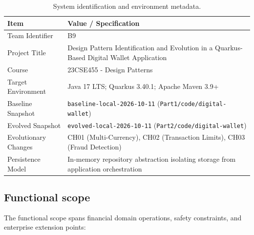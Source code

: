 \documentclass[11pt,a4paper]{article}
\begin{document}
\begin{table}[h!]
\centering
\small
\begin{tabularx}{\textwidth}{lX}
\toprule
\textbf{Item} & \textbf{Value / Specification} \\
\midrule
Team Identifier & B9 \\
Project Title & Design Pattern Identification and Evolution in a Quarkus-Based Digital Wallet Application \\
Course & 23CSE455 - Design Patterns \\
Target Environment & Java 17 LTS; Quarkus 3.40.1; Apache Maven 3.9+ \\
Baseline Snapshot & \texttt{baseline-local-2026-10-11} (\texttt{Part1/code/digital-wallet}) \\
Evolved Snapshot & \texttt{evolved-local-2026-10-11} (\texttt{Part2/code/digital-wallet}) \\
Evolutionary Changes & CH01 (Multi-Currency), CH02 (Transaction Limits), CH03 (Fraud Detection) \\
Persistence Model & In-memory repository abstraction isolating storage from application orchestration \\
\bottomrule
\end{tabularx}
\caption{System identification and environment metadata.}
\end{table}

\subsection{Functional scope}
The functional scope spans financial domain operations, safety constraints, and enterprise extension points:
\end{document}
